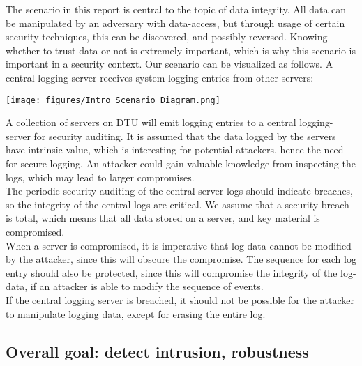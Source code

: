 The scenario in this report is central to the topic of data integrity. All data can be manipulated by an adversary with data-access, but through usage of certain security techniques, this can be discovered, and possibly reversed. Knowing whether to trust data or not is extremely important, which is why this scenario is important in a security context.
Our scenario can be visualized as follows. A central logging server receives system logging entries from other servers:
\\

\begin{center}
    \texttt{[image: figures/Intro\_Scenario\_Diagram.png]}
\end{center}

A collection of servers on DTU will emit logging entries to a central logging-server for security auditing. It is assumed that the data logged by the servers have intrinsic value, which is interesting for potential attackers, hence the need for secure logging. An attacker could gain valuable knowledge from inspecting the logs, which may lead to larger compromises.
\\The periodic security auditing of the central server logs should indicate breaches, so the integrity of the central logs are critical.
We assume that a security breach is total, which means that all data stored on a server, and key material is compromised.
\\When a server is compromised, it is imperative that log-data cannot be modified by the attacker, since this will obscure the compromise.
The sequence for each log entry should also be protected, since this will compromise the integrity of the log-data, if an attacker is able to modify the sequence of events.
\\If the central logging server is breached, it should not be possible for the attacker to manipulate logging data, except for erasing the entire log.

\subsection{Overall goal: detect intrusion, robustness}

